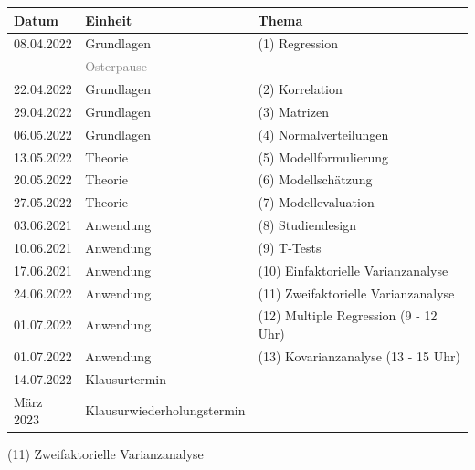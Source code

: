 \documentclass[
  8pt,
  ignorenonframetext,
]{beamer}
\begin{document}
\begin{frame}{}
\protect\hypertarget{section-1}{}
\small
\center
\footnotesize
\begin{tabular}{lll}
Datum        & Einheit                       & Thema                                    \\\hline
08.04.2022   & Grundlagen                    & (1) Regression                           \\
             & \textcolor{gray}{Osterpause}                                             \\
22.04.2022   & Grundlagen                    & (2) Korrelation                          \\
29.04.2022   & Grundlagen                    & (3) Matrizen                             \\
06.05.2022   & Grundlagen                    & (4) Normalverteilungen                   \\
13.05.2022   & Theorie                       & (5) Modellformulierung                   \\
20.05.2022   & Theorie                       & (6) Modellschätzung                      \\
27.05.2022   & Theorie                       & (7) Modellevaluation                     \\
03.06.2021   & Anwendung                     & (8) Studiendesign                        \\
10.06.2021   & Anwendung                     & (9) T-Tests                              \\
17.06.2021   & Anwendung                     & (10) Einfaktorielle Varianzanalyse       \\
24.06.2022   & Anwendung                     & (11) Zweifaktorielle Varianzanalyse      \\
01.07.2022   & Anwendung                     & (12) Multiple Regression (9 - 12 Uhr)    \\
01.07.2022   & Anwendung                     & (13) Kovarianzanalyse (13 - 15 Uhr)      \\\hline
14.07.2022   & Klausurtermin                 &                                          \\
März 2023    & Klausurwiederholungstermin    &
\end{tabular}
\end{frame}

\begin{frame}[plain]{}
\protect\hypertarget{section-2}{}
\center
\huge
\vfill

\noindent (11) Zweifaktorielle Varianzanalyse \vfill
\end{frame}
\end{document}
